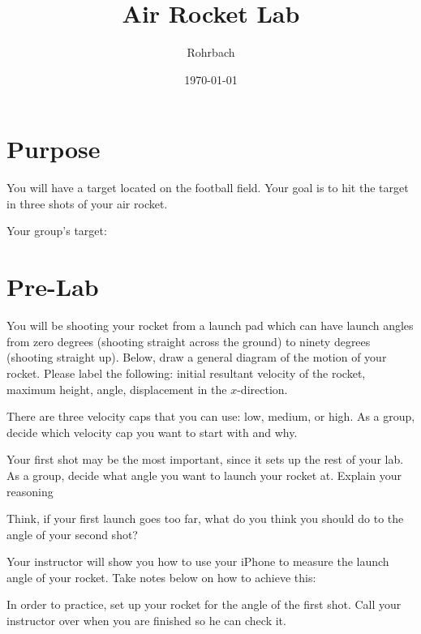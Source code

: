 \documentclass[10pt]{exam}
\title{Air Rocket Lab}
\author{Rohrbach}
\date{\today}
\begin{document}
\maketitle

\section*{Purpose}

You will have a target located on the football field.  Your goal is to hit the target in three shots of your air rocket.

\begin{center}
  Your group's target: \fillin[][10em]
\end{center}

\section*{Pre-Lab}

\begin{questions}

  \question
    You will be shooting your rocket from a launch pad which can have launch angles from zero degrees (shooting straight across the ground) to ninety degrees (shooting straight up).  Below, draw a general diagram of the motion of your rocket.  Please label the following: initial resultant velocity of the rocket, maximum height, angle, displacement in the $x$-direction.

    \vspace{10em}


  \question
    There are three velocity caps that you can use: low, medium, or high.  As a group, decide which velocity cap you want to start with and why.
    \vs

  \question
    Your first shot may be the most important, since it sets up the rest of your lab.  As a group, decide what angle you want to launch your rocket at.  Explain your reasoning
    \vs

  \question
    Think, if your first launch goes too far, what do you think you should do to the angle of your second shot?
    \vs


  \pagebreak
  \question
    Your instructor will show you how to use your iPhone to measure the launch angle of your rocket.  Take notes below on how to achieve this:
    \vs

  \question
    In order to practice, set up your rocket for the angle of the first shot.  Call your instructor over when you are finished so he can check it.
  
\end{questions}
\end{document}
